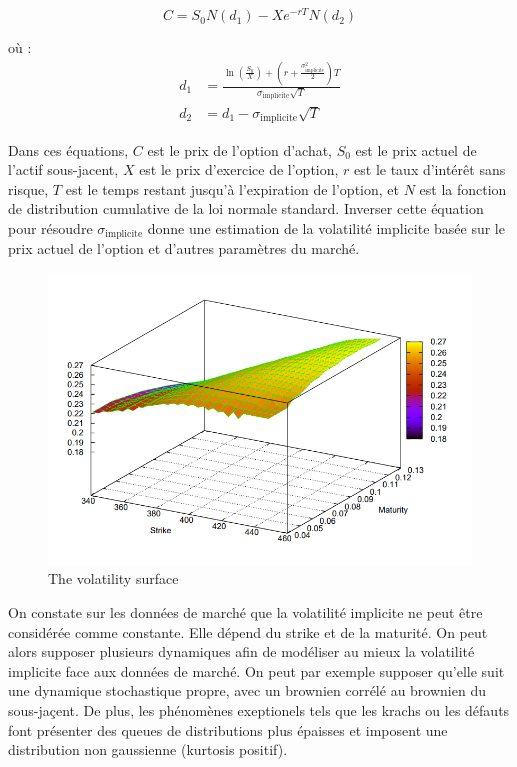 \documentclass[a4paper]{article}
\begin{document}
\begin{equation}
C = S_0 N(d_1) - Xe^{-rT}N(d_2)
\end{equation}

où :
\begin{align*}
d_1 &= \frac{\ln\left(\frac{S_0}{X}\right) + \left(r + \frac{\sigma_{\text{implicite}}^2}{2}\right)T}{\sigma_{\text{implicite}}\sqrt{T}} \\
d_2 &= d_1 - \sigma_{\text{implicite}}\sqrt{T}
\end{align*}

Dans ces équations, \(C\) est le prix de l'option d'achat, \(S_0\) est le prix actuel de l'actif sous-jacent, \(X\) est le prix d'exercice de l'option, \(r\) est le taux d'intérêt sans risque, \(T\) est le temps restant jusqu'à l'expiration de l'option, et \(N\) est la fonction de distribution cumulative de la loi normale standard.
\vspace{2mm}
Inverser cette équation pour résoudre \(\sigma_{\text{implicite}}\) donne une estimation de la volatilité implicite basée sur le prix actuel de l'option et d'autres paramètres du marché.

\begin{figure}[H]
    \centering
    \includegraphics[scale=0.7]{figures/implied_vol.png}
    \caption{The volatility surface}
    \label{fig:enter-label}
\end{figure}

On constate sur les données de marché que la volatilité implicite ne peut être considérée comme constante. Elle dépend du strike et de la maturité. On peut alors supposer plusieurs dynamiques afin de modéliser au mieux la volatilité implicite face aux données de marché. On peut par exemple supposer qu'elle suit une dynamique stochastique propre, avec un brownien corrélé au brownien du sous-jaçent. De plus, les phénomènes exeptionels tels que les krachs ou les défauts font présenter des queues de distributions plus épaisses et imposent une distribution non gaussienne (kurtosis positif). 
\end{document}
